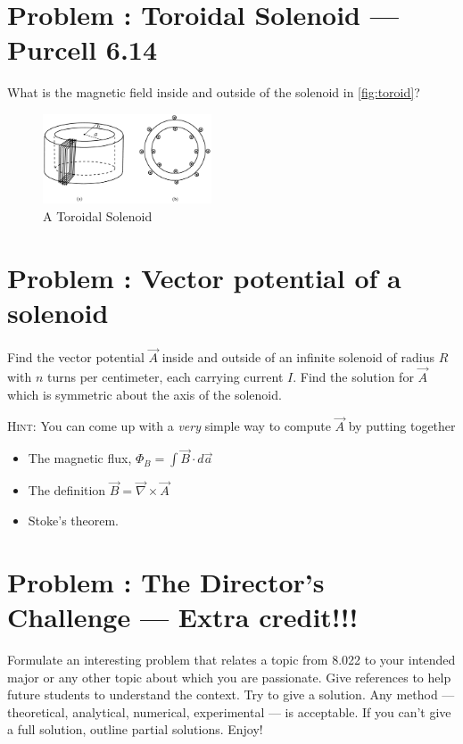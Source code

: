 \documentclass[problems]{esg8022pset}
\begin{document}
\section{Problem \thesection: Toroidal Solenoid --- Purcell 6.14}
  What is the magnetic field inside and outside of the solenoid in \autoref{fig:toroid}?
  \begin{figure}[H]
    \centering
    \includegraphics[width = 5cm]{Toroid}
    \caption{A Toroidal Solenoid}
    \label{fig:toroid}
  \end{figure}
\section{Problem \thesection: Vector potential of a solenoid}
  Find the vector potential $\vec A$ inside and outside of an infinite solenoid
  of radius $R$ with $n$ turns per centimeter, each carrying current $I$.  Find
  the solution for $\vec A$ which is symmetric about the axis of the solenoid.

  \noindent \textsc{Hint}: You can come up with a \emph{very} simple way to
  compute $\vec A$ by putting together
  \begin{itemize}
    \item The magnetic flux, $\Phi_B = \int \vec B\cdot d\vec a$
    \item The definition $\vec B = \vec\nabla\times\vec A$
    \item Stoke's theorem.
  \end{itemize}
\section{Problem \thesection: The Director's Challenge --- Extra credit!!!}
  Formulate an interesting problem that relates a topic from 8.022 to your
  intended major or any other topic about which you are passionate.  Give references
  to help future students to understand the context.  Try to give a solution.
  Any method --- theoretical, analytical, numerical, experimental --- is acceptable.
  If you can't give a full solution, outline partial solutions. Enjoy!
\end{document}
